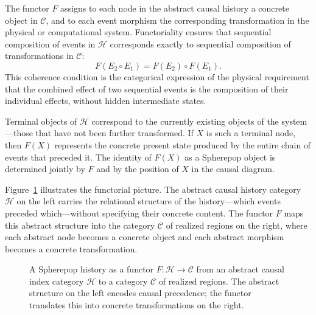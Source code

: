 \documentclass[12pt]{article}
\theoremstyle{plain}
\theoremstyle{definition}
\theoremstyle{remark}
\begin{document}
The functor $F$ assigns to each node in the abstract causal history a concrete
object in $\mathcal{C}$, and to each event morphism the corresponding
transformation in the physical or computational system.  Functoriality ensures
that sequential composition of events in $\mathcal{H}$ corresponds exactly to
sequential composition of transformations in $\mathcal{C}$:
\[
  F(E_2 \circ E_1) = F(E_2) \circ F(E_1).
\]
This coherence condition is the categorical expression of the physical
requirement that the combined effect of two sequential events is the
composition of their individual effects, without hidden intermediate states.

Terminal objects of $\mathcal{H}$ correspond to the currently existing objects
of the system---those that have not been further transformed.  If $X$ is such a
terminal node, then $F(X)$ represents the concrete present state produced by
the entire chain of events that preceded it.  The identity of $F(X)$ as a
Spherepop object is determined jointly by $F$ and by the position of $X$ in
the causal diagram.

Figure~\ref{fig:functor} illustrates the functorial picture.  The abstract
causal history category $\mathcal{H}$ on the left carries the relational
structure of the history---which events preceded which---without specifying
their concrete content.  The functor $F$ maps this abstract structure into the
category $\mathcal{C}$ of realized regions on the right, where each abstract
node becomes a concrete object and each abstract morphism becomes a concrete
transformation.

\begin{figure}[ht]
\centering
{}
\caption{A Spherepop history as a functor $F : \mathcal{H} \rightarrow \mathcal{C}$
from an abstract causal index category $\mathcal{H}$ to a category $\mathcal{C}$
of realized regions.  The abstract structure on the left encodes causal
precedence; the functor translates this into concrete transformations on the right.}
\label{fig:functor}
\end{figure}
\end{document}
